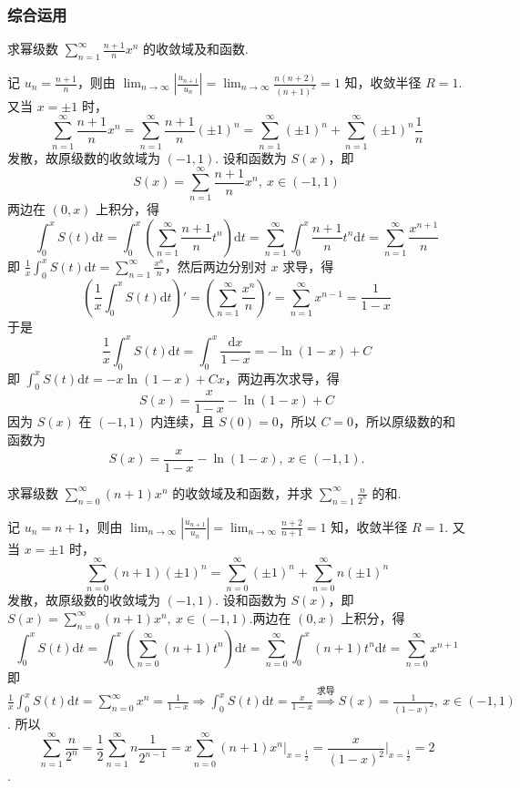 \subsubsection{综合运用}

\begin{example}
    求幂级数 $\displaystyle\sum_{n=1}^\infty\frac{n+1}{n}x^n$ 的收敛域及和函数.
\end{example}
\begin{solution}
    记 $\displaystyle u_n=\frac{n+1}{n}$，则由 $\displaystyle\lim_{n\to\infty}\left|\frac{u_{n+1}}{u_n}\right|=\lim_{n\to\infty}\frac{n(n+2)}{(n+1)^2}=1$ 知，收敛半径 $R=1$.
    又当 $x=\pm 1$ 时，
    $$\displaystyle\sum_{n=1}^\infty\frac{n+1}{n}x^n=\sum_{n=1}^\infty\frac{n+1}{n}(\pm 1)^n=\sum_{n=1}^\infty(\pm 1)^n+\sum_{n=1}^\infty(\pm 1)^n\frac{1}{n}$$
    发散，故原级数的收敛域为 $(-1,1)$.
    设和函数为 $S(x)$，即 $$\displaystyle S(x)=\sum_{n=1}^\infty\frac{n+1}{n}x^n,~x\in(-1,1)$$
    两边在 $(0,x)$ 上积分，得
    $$\int_0^xS(t)\mathrm{d}t=\int_0^x\left(\sum_{n=1}^\infty\frac{n+1}{n}t^n\right)\mathrm{d}t=\sum_{n=1}^\infty\int_0^x\frac{n+1}{n}t^n\mathrm{d}t=\sum_{n=1}^\infty\frac{x^{n+1}}{n}$$
    即 $\displaystyle\frac{1}{x}\int_0^xS(t)\mathrm{d}t=\sum_{n=1}^\infty\frac{x^n}{n}$，然后两边分别对 $x$ 求导，得
    $$\left(\frac{1}{x}\int_0^xS(t)\mathrm{d}t\right)'=\left(\sum_{n=1}^\infty\frac{x^n}{n}\right)'=\sum_{n=1}^\infty x^{n-1}=\frac{1}{1-x}$$
    于是$$\frac{1}{x}\int_0^xS(t)\mathrm{d}t=\int_0^x\frac{\mathrm{d}x}{1-x}=-\ln(1-x)+C$$
    即 $\displaystyle\int_0^xS(t)\mathrm{d}t=-x\ln(1-x)+Cx$，两边再次求导，得
    $$S(x)=\frac{x}{1-x}-\ln(1-x)+C$$
    因为 $S(x)$ 在 $(-1,1)$ 内连续，且 $S(0)=0$，所以 $C=0$，所以原级数的和函数为
    $$S(x)=\frac{x}{1-x}-\ln(1-x),~x\in(-1,1).$$
\end{solution}

\begin{example}
    求幂级数 $\displaystyle\sum_{n=0}^\infty(n+1)x^n$ 的收敛域及和函数，并求 $\displaystyle\sum_{n=1}^\infty\frac{n}{2^n}$ 的和.
\end{example}
\begin{solution}
    记 $u_n=n+1$，则由 $\displaystyle\lim_{n\to\infty}\left|\frac{u_{n+1}}{u_n}\right|=\lim_{n\to\infty}\frac{n+2}{n+1}=1$ 知，收敛半径 $R=1$.
    又当 $x=\pm 1$ 时，$$\displaystyle\sum_{n=0}^\infty(n+1)(\pm 1)^n=\sum_{n=0}^\infty(\pm 1)^n+\sum_{n=0}^\infty n(\pm 1)^n$$
    发散，故原级数的收敛域为 $(-1,1)$. 设和函数为 $S(x)$，即 $\displaystyle S(x)=\sum_{n=0}^\infty(n+1)x^n,~x\in(-1,1)$.两边在 $(0,x)$ 上积分，得
    $$\int_0^xS(t)\mathrm{d}t=\int_0^x\left(\sum_{n=0}^\infty(n+1)t^n\right)\mathrm{d}t=\sum_{n=0}^\infty\int_0^x(n+1)t^n\mathrm{d}t=\sum_{n=0}^\infty x^{n+1}$$
    即 $\displaystyle\frac{1}{x}\int_0^xS(t)\mathrm{d}t=\sum_{n=0}^\infty x^n=\frac{1}{1-x}\Rightarrow \int_0^xS(t)\mathrm{d}t=\frac{x}{1-x}\overset{\text{求导}}{\Rightarrow}S(x)=\frac{1}{(1-x)^2},~x\in(-1,1)$.
    所以 $$\displaystyle\sum_{n=1}^\infty\frac{n}{2^n}=\frac{1}{2}\sum_{n=1}^\infty n \frac{1}{2^{n-1}}=x\sum_{n=0}^\infty(n+1)x^n\Biggl |_{x=\frac{1}{2}}=\frac{x}{(1-x)^2}\Biggl |_{x=\frac{1}{2}}=2$$.
\end{solution}

